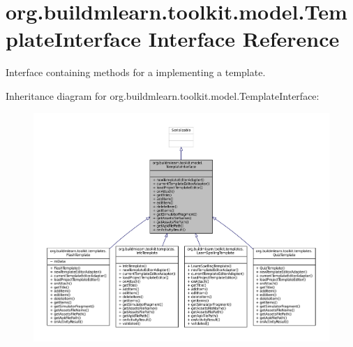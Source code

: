 \hypertarget{interfaceorg_1_1buildmlearn_1_1toolkit_1_1model_1_1TemplateInterface}{\section{org.\-buildmlearn.\-toolkit.\-model.\-Template\-Interface Interface Reference}
\label{interfaceorg_1_1buildmlearn_1_1toolkit_1_1model_1_1TemplateInterface}
}


Interface containing methods for a implementing a template.  




Inheritance diagram for org.\-buildmlearn.\-toolkit.\-model.\-Template\-Interface\-:
\nopagebreak
\begin{figure}[H]
\begin{center}
\leavevmode
\includegraphics[width=350pt]{db/d45/interfaceorg_1_1buildmlearn_1_1toolkit_1_1model_1_1TemplateInterface__inherit__graph}
\end{center}
\end{figure}


